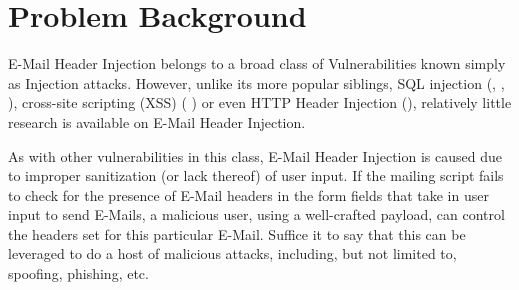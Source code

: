 \section{Problem Background}

E-Mail Header Injection belongs to a broad class of Vulnerabilities known simply as Injection attacks. However, unlike its more popular siblings, SQL injection (\cite{sql0}, \cite{sql1}, \cite{sql2}), cross-site scripting (XSS) (\cite{Injection1} \cite{KleinAmit}) or even HTTP Header Injection (\cite{sessionride}), relatively little research is available on E-Mail Header Injection.

As with other vulnerabilities in this class, E-Mail Header Injection is caused due to improper sanitization (or lack thereof) of user input. If the mailing script fails to check for the presence of E-Mail headers in the form fields that take in user input to send E-Mails, a malicious user, using a well-crafted payload, can control the headers set for this particular E-Mail. Suffice it to say that this can be leveraged to do a host of malicious attacks, including, but not limited to, spoofing, phishing, etc.